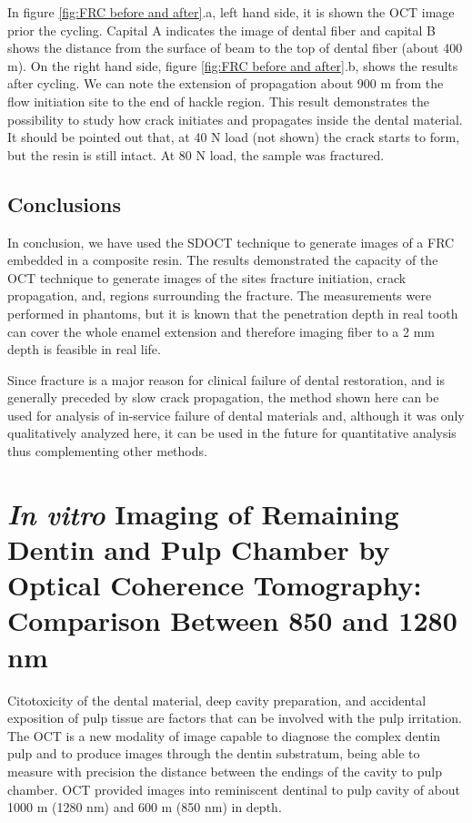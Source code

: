 \documentclass[12pt,twoside,english]{book}
\renewcommand{\~}{\perispomeni}%
\DeclareRobustCommand{\textgreek}[1]{\leavevmode{\greektext #1}}
\numberwithin{equation}{section}
\numberwithin{figure}{section}
\begin{document}
In figure \ref{fig:FRC before and after}.a, left hand side, it is shown the OCT image prior the cycling. Capital A indicates the image of dental fiber and capital B shows the distance from the surface of beam to the top of dental fiber (about 400 \textgreek{m}m). On the right hand side, figure \ref{fig:FRC before and after}.b, shows the results after cycling. We can note the extension of propagation about 900 \textgreek{m}m from the flow initiation site to the end of hackle region. This result demonstrates the possibility to study how crack initiates and propagates inside the dental material. It should be pointed out that, at 40 N load (not shown) the crack starts to form, but the resin is still intact. At 80 N load, the sample was fractured.

\subsection{Conclusions}

In conclusion, we have used the SDOCT technique to generate images of a FRC embedded in a composite resin. The results demonstrated the capacity of the OCT technique to generate images of the sites fracture initiation, crack propagation, and, regions surrounding the fracture. The measurements were performed in phantoms, but it is known that the penetration depth in real tooth can cover the whole enamel extension\cite{DeMelo:2005p2100} and therefore imaging fiber to a 2 mm depth is feasible in real life. 

Since fracture is a major reason for clinical failure of dental restoration, and is generally preceded by slow crack propagation, the method shown here can be used for analysis of in-service failure of dental materials and, although it was only qualitatively analyzed here, it can be used in the future for quantitative analysis thus complementing other methods\cite{Loughran:2005p2526}.


\section[Imaging of Dentin and Pulp Chamber by OCT]{\emph{In vitro} Imaging of Remaining Dentin and Pulp Chamber by Optical Coherence Tomography: Comparison Between 850 and 1280 nm}

Citotoxicity of the dental material, deep cavity preparation, and accidental exposition of pulp tissue are factors that can be involved with the pulp irritation. The OCT is a new modality of image capable to diagnose the complex dentin pulp and to produce images through the dentin substratum, being able to measure with precision the distance between the endings of the cavity to pulp chamber. OCT provided images into reminiscent dentinal to pulp cavity of about 1000 \textgreek{m}m (1280 nm) and 600 \textgreek{m}m (850 nm) in depth.
\end{document}
